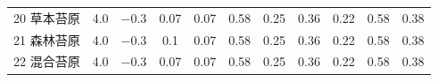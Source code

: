 \begin{landscape}
\begin{table}[htbp]
\begin{tabular}{@{}lcccccccccc@{}}
        20 草本苔原    & 4.0        & \num { -0.3  }                                                                       & 0.07                                                                                                            & 0.07                                                                                                            & 0.58                                                                                                            & 0.25                                                                                                            & 0.36                                                                                                            & 0.22                                                                                                            & 0.58                                                                                                            & 0.38                                                                                                            \\
        21 森林苔原    & 4.0        & \num { -0.3  }                                                                       & 0.1                                                                                                             & 0.07                                                                                                            & 0.58                                                                                                            & 0.25                                                                                                            & 0.36                                                                                                            & 0.22                                                                                                            & 0.58                                                                                                            & 0.38                                                                                                            \\
        22 混合苔原    & 4.0        & \num { -0.3  }                                                                       & 0.07                                                                                                            & 0.07                                                                                                            & 0.58                                                                                                            & 0.25                                                                                                            & 0.36                                                                                                            & 0.22                                                                                                            & 0.58                                                                                                            & 0.38                                                                                                            \\

\end{tabular}
\end{table}
\end{landscape}
